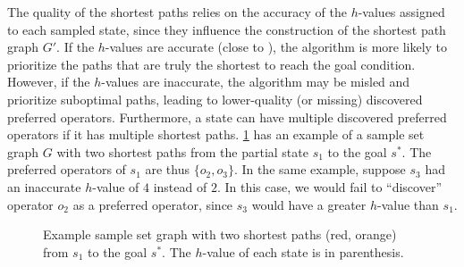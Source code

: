 \documentclass[ppgc,diss,english]{iiufrgs}
\begin{document}
The quality of the shortest paths relies on the accuracy of the $h$-values assigned to each sampled state, since they influence the construction of the shortest path graph $G'$. If the $h$-values are accurate (close to \hstar), the algorithm is more likely to prioritize the paths that are truly the shortest to reach the goal condition. However, if the $h$-values are inaccurate, the algorithm may be misled and prioritize suboptimal paths, leading to lower-quality (or missing) discovered preferred operators.
Furthermore, a state can have multiple discovered preferred operators if it has multiple shortest paths. \cref{fig:spg-example} has an example of a sample set graph $G$ with two shortest paths from the partial state $s_{1}$ to the goal $s^{*}$. The preferred operators of $s_{1}$ are thus $\{o_{2}, o_{3}\}$. In the same example, suppose $s_{3}$ had an inaccurate $h$-value of $4$ instead of $2$. In this case, we would fail to ``discover'' operator $o_{2}$ as a preferred operator, since $s_{3}$ would have a greater $h$-value than $s_{1}$.

\begin{figure}[htb]
\caption[Example sample set graph with two shortest paths]{Example sample set graph with two shortest paths (red, orange) from $s_{1}$ to the goal $s^{*}$. The $h$-value of each state is in parenthesis.}
\centering
{}
\label{fig:spg-example}
\end{figure}
\end{document}
